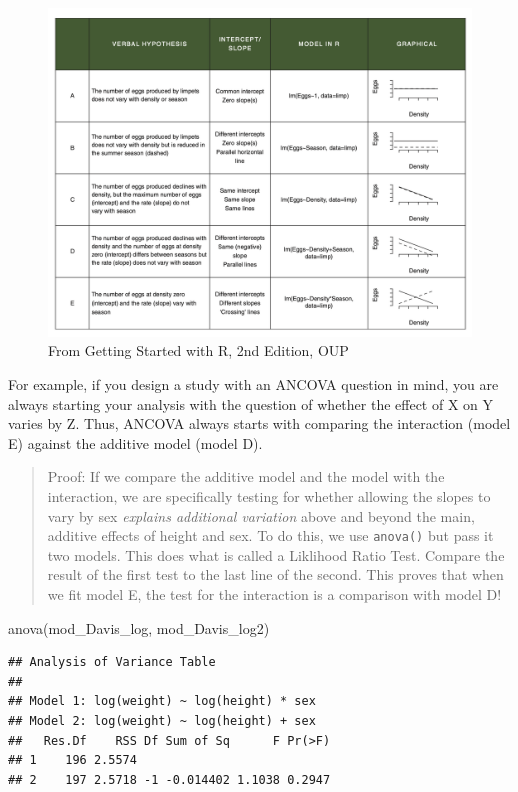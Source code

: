 \documentclass[
]{book}
\newenvironment{Shaded}{\begin{snugshade}}{\end{snugshade}}
\newcommand{\FunctionTok}[1]{\textcolor[rgb]{0.00,0.00,0.00}{#1}}
\newcommand{\NormalTok}[1]{#1}
\begin{document}
\begin{figure}
\includegraphics[width=20.56in]{images/GSwithR_Grid} \caption{From Getting Started with R, 2nd Edition, OUP}\label{fig:unnamed-chunk-49}
\end{figure}

For example, if you design a study with an ANCOVA question in mind, you are always starting your analysis with the question of whether the effect of X on Y varies by Z. Thus, ANCOVA always starts with comparing the interaction (model E) against the additive model (model D).

\begin{quote}
Proof: If we compare the additive model and the model with the interaction, we are specifically testing for whether allowing the slopes to vary by sex \emph{explains additional variation} above and beyond the main, additive effects of height and sex. To do this, we use \texttt{anova()} but pass it two models. This does what is called a Liklihood Ratio Test.
Compare the result of the first test to the last line of the second. This proves that when we fit model E, the test for the interaction is a comparison with model D!
\end{quote}

\begin{Shaded}
\begin{Highlighting}[]
\FunctionTok{anova}\NormalTok{(mod\_Davis\_log, mod\_Davis\_log2)}
\end{Highlighting}
\end{Shaded}

\begin{verbatim}
## Analysis of Variance Table
## 
## Model 1: log(weight) ~ log(height) * sex
## Model 2: log(weight) ~ log(height) + sex
##   Res.Df    RSS Df Sum of Sq      F Pr(>F)
## 1    196 2.5574                           
## 2    197 2.5718 -1 -0.014402 1.1038 0.2947
\end{verbatim}
\end{document}
